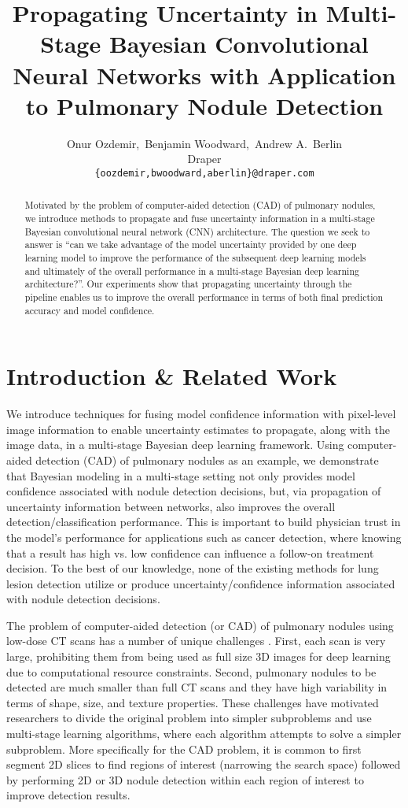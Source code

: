 \documentclass{article}
\title{Propagating Uncertainty in Multi-Stage Bayesian Convolutional Neural Networks with Application to Pulmonary Nodule Detection}
\author{
  Onur Ozdemir,\, Benjamin Woodward,\, Andrew A.~Berlin \\
  Draper\\
  \texttt{\{oozdemir,bwoodward,aberlin\}@draper.com} \vspace{-.4cm}
}
\begin{document}
\maketitle

\begin{abstract}
	Motivated by the problem of computer-aided detection (CAD) of pulmonary nodules, we introduce methods to propagate and fuse uncertainty information in a multi-stage Bayesian convolutional neural network (CNN) architecture. The question we seek to answer is ``can we take advantage of the model uncertainty provided by one deep learning model to improve the performance of the subsequent deep learning models and ultimately of the overall performance in a multi-stage Bayesian deep learning architecture?''. Our experiments show that propagating uncertainty through the pipeline enables us to improve the overall performance in terms of both final prediction accuracy and model confidence.
\end{abstract}

\section{Introduction  \& Related Work}\label{sec:bayesnet}


We introduce techniques for fusing model confidence information with pixel-level image information to enable uncertainty estimates to propagate, along with the image data, in a multi-stage Bayesian deep learning framework. Using computer-aided detection (CAD) of pulmonary nodules as an example, we demonstrate that Bayesian modeling in a multi-stage setting not only provides model confidence associated with nodule detection decisions, but, via propagation of uncertainty information between networks, also improves the overall detection/classification performance. This is important to build physician trust in the model's performance for applications such as cancer detection, where knowing that a result has high vs. low confidence can influence a follow-on treatment decision. To the best of our knowledge, none of the existing methods for lung lesion detection \cite{ypsilantis_arxiv16, setio_mi16, roth_mi16, zhu_arxiv17, ding_arxiv17} utilize or produce uncertainty/confidence information associated with nodule detection decisions.


The problem of computer-aided detection (or CAD) of pulmonary nodules using low-dose CT scans has a number of unique challenges \cite{anode09, luna16}. First, each scan is very large, prohibiting them from being used as full size 3D images for deep learning due to computational resource constraints. Second, pulmonary nodules to be detected are much smaller than full CT scans and they have high variability in terms of shape, size, and texture properties. These challenges have motivated researchers to divide the original problem into simpler subproblems and use multi-stage learning algorithms, where each algorithm attempts to solve a simpler subproblem. More specifically for the CAD problem, it is common to first segment 2D slices to find regions of interest (narrowing the search space) followed by performing 2D or 3D nodule detection within each region of interest to improve detection results.
\end{document}
